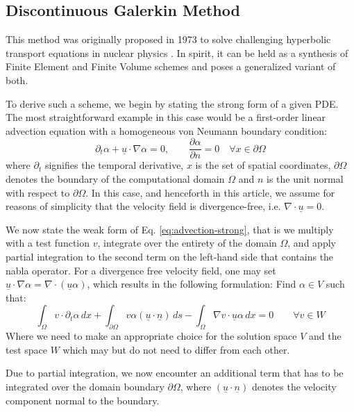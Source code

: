 \documentclass[asi,article,submit,moreauthors]{Definitions/mdpi}
\begin{document}
\subsection{Discontinuous Galerkin Method}

This method was originally proposed in 1973 to solve challenging hyperbolic transport equations in nuclear physics \cite{reedTriangularMeshMethods1973}.
In spirit, it can be held as a synthesis of Finite Element and Finite Volume schemes and poses a generalized variant of both.

To derive such a scheme, we begin by stating the strong form of a given PDE. The most straightforward example in this case would be a first-order linear advection equation with a homogeneous von Neumann boundary condition:
\begin{equation} \label{eq:advection-strong}
    \partial_t \alpha + \underline{u} \cdot \nabla \alpha = 0, \qquad \frac{\partial \alpha}{\partial n} = 0 \quad\forall x \in \partial \Omega
\end{equation}
where $\partial_t$ signifies the temporal derivative, $x$ is the set of spatial coordinates, $\partial \Omega$ denotes the boundary of the computational domain $\Omega$ and $n$ is the unit normal with respect to $\partial \Omega$.
In this case, and henceforth in this article, we assume for reasons of simplicity that the velocity field is divergence-free, i.e. $\nabla \cdot \underline{u} = 0$.

We now state the weak form of Eq. \ref{eq:advection-strong}, that is we multiply with a test function $v$, integrate over the entirety of the domain $\Omega$, and apply partial integration to the second term on the left-hand side that contains the nabla operator.
For a divergence free velocity field, one may set $\underline{u} \cdot \nabla \alpha = \nabla \cdot \left(\underline{u}\alpha\right)$, which results in the following formulation: Find $\alpha \in V$ such that:
\begin{equation}\label{eq:advection-weak-dgm}
    \int_\Omega v \cdot \partial_t \alpha \,dx + \int_{\partial \Omega} v \alpha (\underline{u}\cdot \underline{n}) \,ds - \int_\Omega \nabla v \cdot \underline{u} \alpha \,dx = 0 \qquad \forall v \in W
\end{equation}
Where we need to make an appropriate choice for the solution space $V$ and the test space $W$ which may but do not need to differ from each other.

Due to partial integration, we now encounter an additional term that has to be integrated over the domain boundary $\partial \Omega$, where $(\underline{u}\cdot \underline{n})$ denotes the velocity component normal to the boundary.
\end{document}
